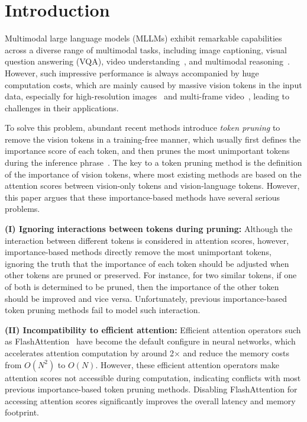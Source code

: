\section{Introduction}\label{sec:introduction}


Multimodal large language models (MLLMs) exhibit remarkable capabilities across a diverse range of multimodal tasks, including image captioning, visual question answering (VQA), video understanding~\citep{wang2024internvideo2}, and multimodal reasoning~\citep{wang2024exploring}. %
 However, such impressive performance is always accompanied by huge computation costs, which are mainly caused by massive vision tokens in the input data, especially for high-resolution images~\citep{li2024mini} and multi-frame video~\citep{tang2023video}, leading to challenges in their applications. 


To solve this problem, abundant recent methods introduce \emph{token pruning} to remove the vision tokens in a training-free manner, which usually first defines the importance score of each token, and then prunes the most unimportant tokens during the inference phrase~\citep{chen2024image, zhang2024sparsevlm, liu2024multi}.  The key to a token pruning method is the definition of the importance of vision tokens, where most existing methods are based on the attention scores between vision-only tokens and vision-language tokens. However, this paper argues that these importance-based methods have several serious problems.

\noindent \textbf{(I) Ignoring interactions between tokens during pruning:} Although the interaction between different tokens is considered in attention scores, however, importance-based methods directly remove the most unimportant tokens, ignoring the truth that the importance of each token should be adjusted when other tokens are pruned or preserved. For instance, for two similar tokens, if one of both is determined to be pruned, then the importance of the other token should be improved and vice versa. Unfortunately, previous importance-based token pruning methods fail to model such interaction.


\noindent \textbf{(II) Incompatibility to efficient attention:} Efficient attention operators such as FlashAttention~\cite{dao2022flashattention} have become the default configure in neural networks, which accelerates attention computation by around 2$\times$ and reduce the memory costs from $O(N^2)$ to $O(N)$. %
However, these efficient attention operators make attention scores not accessible during computation, indicating conflicts with most previous importance-based token pruning methods. Disabling FlashAttention for accessing attention scores significantly improves the overall latency and memory footprint.


